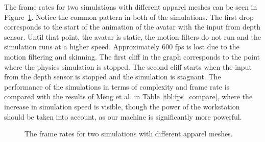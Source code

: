 \documentclass[number,preprint,review,12pt]{elsarticle}
\begin{document}
{\color{red}
The frame rates for two simulations with different apparel meshes can be seen in Figure~\ref{fig:fps}. Notice the common pattern in both of the simulations. The first drop corresponds to the start of the animation of the avatar with the input from depth sensor. Until that point, the avatar is static, the motion filters do not run and the simulation runs at a higher speed. Approximately 600 fps is lost due to the motion filtering and skinning. The first cliff in the graph corresponds to the point where the physics simulation is stopped. The second cliff starts when the input from the depth sensor is stopped and the simulation is stagnant. The performance of the simulations in terms of complexity and frame rate is compared with the results of Meng et al.\cite{Meng2010} in Table \ref{tbl:fps_compare}, where the increase in simulation speed is visible, though the power of the workstation should be taken into account, as our machine is significantly more powerful. 
}

\begin{figure}[htbp]
{\color{red}
	\begin{center} 
	\end{center}
	\caption{The frame rates for two simulations with different apparel meshes. }
	\label{fig:fps}
}
\end{figure}
\end{document}
